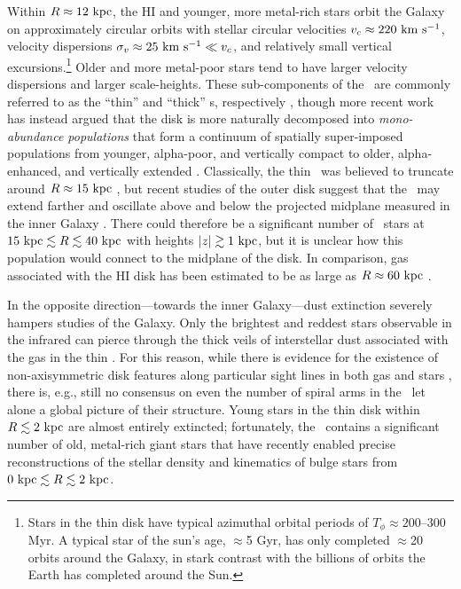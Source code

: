 
Within $R\approx 12~\mathrm{kpc}$, the HI and younger, more metal-rich stars orbit the
Galaxy on approximately circular orbits with stellar circular velocities $v_c
\approx 220~\mathrm{km}~\mathrm{s}^{-1}$, velocity dispersions $\sigma_v \approx 25~\mathrm{km}~\mathrm{s}^{-1} \ll v_c$, and
relatively small vertical excursions.\footnote{Stars in the thin disk have
typical azimuthal orbital periods of $T_\phi \approx 200$--300 Myr. A typical
star of the sun's age, $\approx$5 Gyr, has only completed $\approx$20 orbits
around the Galaxy, in stark contrast with the billions of orbits the Earth has
completed around the Sun.} Older and more metal-poor stars tend to have larger
velocity dispersions and larger scale-heights. These sub-components of the
\mwdisk\ are commonly referred to as the ``thin'' and ``thick'' \mwdisk s,
respectively \citep{gilmore83}, though more recent work has instead argued that
the disk is more naturally decomposed into \emph{mono-abundance populations}
that form a continuum of spatially super-imposed populations from younger,
alpha-poor, and vertically compact to older, alpha-enhanced, and vertically
extended \citep[see, e.g., Figure~12 and Section~6 in][]{rixbovy13,
bovy12-nothickdisk}. Classically, the thin \mwdisk\ was believed to truncate
around $R \approx 15~\mathrm{kpc}$ \citep[e.g.,][]{robin92}, but recent studies of the
outer disk suggest that the \mwdisk\ may extend farther and oscillate above and
below the projected midplane measured in the inner Galaxy \citep{xu15,
apw15-triand}. There could therefore be a significant number of \mwdisk\ stars
at $15~\mathrm{kpc} \lesssim R \lesssim 40~\mathrm{kpc}$ with heights $|z| \gtrsim 1~\mathrm{kpc}$, but
it is unclear how this population would connect to the midplane of the disk. In
comparison, gas associated with the HI disk has been estimated to be as large as
$R \approx 60~\mathrm{kpc}$ \citep{kalberla08}.

In the opposite direction---towards the inner Galaxy---dust extinction severely
hampers studies of the Galaxy. Only the brightest and reddest stars observable
in the infrared can pierce through the thick veils of interstellar dust
associated with the gas in the thin \mwdisk. For this reason, while there is
evidence for the existence of non-axisymmetric disk features along particular
sight lines in both gas and stars \citep[e.g.,][]{levine06, reid14}, there is,
e.g., still no consensus on even the number of spiral arms in the \mwdisk\ let
alone a global picture of their structure. Young stars in the thin disk within
$R \lesssim 2~\mathrm{kpc}$ are almost entirely extincted; fortunately, the \mwbulge\
contains a significant number of old, metal-rich giant stars that have recently
enabled precise reconstructions of the stellar density and kinematics of bulge
stars from $0~\mathrm{kpc} \lesssim R \lesssim 2~\mathrm{kpc}$.


